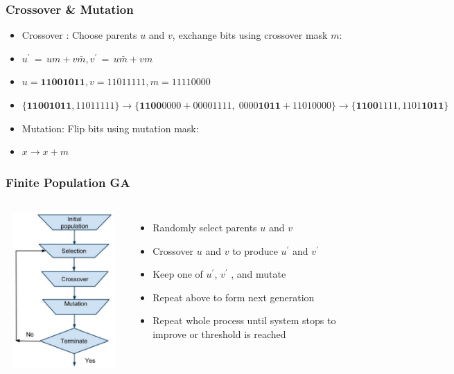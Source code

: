 \documentclass[pdf]{beamer}
\begin{document}
  \begin{frame}
    \frametitle{Crossover \& Mutation}
    \begin{itemize}
      \item{Crossover : Choose parents $u$ and $v$, exchange bits using crossover mask $m$: }
      \item{$u^\prime \,=\, um + v\bar{m} , v^\prime \,=\, u\bar{m} + vm$}      
      \item{$u = \bm{11001011}, v = 11011111, m = 11110000$}
      \item{$\{\bm{11001011}, 11011111\} \to \{\bm{1100}0000 + 00001111,\; 0000\bm{1011} + 11010000\} \to \{\bm{1100}1111, 1101\bm{1011}\}$}
      \item{Mutation: Flip bits using mutation mask:}
      \item{$x \to x + m$}
    \end{itemize}
  \end{frame}
  
  \begin{frame}
    \frametitle{Finite Population GA}
    \begin{columns}
             \centering
             \includegraphics[height=6cm, width=7cm]{figures/eps/GA.eps}
	    \begin{itemize}
              \item{Randomly select parents $u$ and $v$ }
              \item{Crossover $u$ and $v$ to produce $u^\prime$ and $v^\prime$ }
              \item{Keep one of $u^\prime$, $v^\prime$ , and mutate}
              \item{Repeat above to form next generation}
              \item{Repeat whole process until system stops  to improve or threshold is reached}
	    \end{itemize}
         \end{columns} 
  \end{frame}
  
\end{document}
